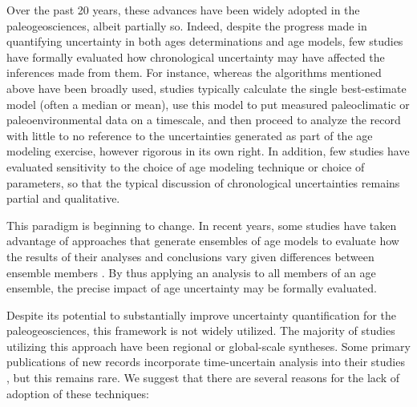 \documentclass[gchron, manuscript]{copernicus}
\begin{document}
Over the past 20 years, these advances have been widely adopted in the paleogeosciences, albeit partially so.
Indeed, despite the progress made in quantifying uncertainty in both ages determinations and age models, few studies have formally evaluated how chronological uncertainty may have affected the inferences made from them.
For instance, whereas the algorithms mentioned above have been broadly used, studies typically calculate the single best-estimate model (often a median or mean), use this model to put measured paleoclimatic or paleoenvironmental data on a timescale, and then proceed to analyze the record with little to no reference to the uncertainties generated as part of the age modeling exercise, however rigorous in its own right.
In addition, few studies have evaluated sensitivity to the choice of age modeling technique or choice of parameters, so that the typical discussion of chronological uncertainties remains partial and qualitative.

This paradigm is beginning to change.
In recent years, some studies have taken advantage of approaches that generate ensembles of age models to evaluate how the results of their analyses and conclusions vary given differences between ensemble members \citep[e.g.,][]{Haam_Huybers2010, Tierney2013, deininger2017coherency, mckay_onset_2018, bhattacharya2020atlantic}.
By thus applying an analysis to all members of an age ensemble, the precise impact of age uncertainty may be formally evaluated.

Despite its potential to substantially improve uncertainty quantification for the paleogeosciences, this framework is not widely utilized.
The majority of studies utilizing this approach have been regional \citep[e.g.,][]{Tierney2013, deininger2017coherency, mckay_onset_2018, bhattacharya2020atlantic} or global-scale \citep[e.g.,][]{Shakun_Nature2012, Marcott_Science2013, kaufman2020HoloceneGMST} syntheses.
Some primary publications of new records incorporate time-uncertain analysis into their studies \citep[e.g.,][]{Boldt2015, falster2018millennial}, but this remains rare.
We suggest that there are several reasons for the lack of adoption of these techniques:
\end{document}
